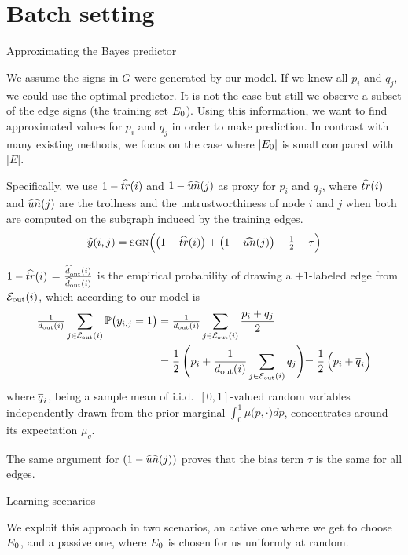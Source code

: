 \documentclass[svgnames,ignorenonframetext,final]{beamer}
\begin{document}


\section{Batch setting}\label{batch-setting}

\begin{frame}[allowframebreaks]{Approximating the Bayes predictor}

We assume the signs in \(G\) were generated by our model. If we knew all
\(p_i\) and \(q_j\), we could use the optimal predictor. It is not the
case but still we observe a subset of the edge signs (the training set
\(E_0\)). Using this information, we want to find approximated
values for \(p_i\) and \(q_j\) in order to make prediction. In contrast
with many existing methods, we focus on the case where \(|E_0|\) is
small compared with \(|E|\).

Specifically, we use \(1-\widehat{tr}(i)\) and \(1-\widehat{un}(j)\) as proxy for
\(p_i\) and \(q_j\), where \(\widehat{tr}(i)\) and \(\widehat{un}(j)\) are the trollness
and the untrustworthiness of node \(i\) and \(j\) when both are computed
on the subgraph induced by the training edges.
\begin{equation}
  \label{eq:predictor}
  \widehat{y}(i,j)=\mbox{\sc sgn}\Big(\big(1-\widehat{tr}(i)\big) + \big(1-\widehat{un}(j)\big) - \tfrac{1}{2} -\tau\Big)
\end{equation}

\(1-\widehat{tr}(i)\) = \(\frac{\widehat{d}_{\mathrm{out}}^-(i)}{\widehat{d}_{\mathrm{out}}(i)}\) is the empirical
probability of drawing a \(+1\)-labeled edge from \(\mathcal{E}_{\mathrm{out}}(i)\), which
according to our model is
\begin{align*}
  \tfrac{1}{d_{\mathrm{out}}(i)}\sum_{j\in \mathcal{E}_{\mathrm{out}}(i)} \mathbb{P}\big( y_{i,j} = 1 \big) &=
  \tfrac{1}{d_{\mathrm{out}}(i)}\sum_{j\in \mathcal{E}_{\mathrm{out}}(i)} \frac{p_i + q_j}{2} \\ &=
\frac{1}{2}\,\Biggl(p_i + \frac{1}{d_{\mathrm{out}}(i)}\sum_{j\in \mathcal{E}_{\mathrm{out}}(i)} q_j \Biggl)=
\frac{1}{2}\,\Bigl(p_i + \overline{q}_i\Bigl)
\end{align*}
where \(\overline{q}_i\), being a
sample mean of i.i.d.~\([0,1]\)-valued random variables independently
drawn from the prior marginal \(\int_0^1 \mu\big(p,\cdot\big) dp\),
concentrates around its expectation \(\mu_q\).

The same argument for $(1-\widehat{un}(j))$ proves that
the bias term \(\tau\) is the same for all edges.

\end{frame}



\begin{frame}{Learning scenarios}

We exploit this approach in two scenarios, an active one where we get to
choose \(E_0\), and a passive one, where \(E_0\) is chosen for
us uniformly at random.

\end{frame}
\end{document}
